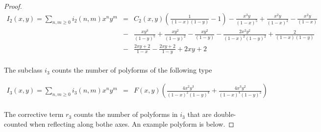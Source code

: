 \documentclass[12pt]{article}
\theoremstyle{plain}
\theoremstyle{definition}
\theoremstyle{remark}
\theoremstyle{definition}
\newcommand{\cellw}[4]{\draw[thick] ( #1 , #2 ) rectangle ( #3 , #4 );}
\newcommand{\cellb}[4]{\filldraw[black!60] ( #1 , #2 ) rectangle ( #3 , #4 ); \draw[thick] ( #1 , #2 ) rectangle ( #3 , #4 );}
\begin{document}
\begin{proof}
\begin{eqnarray*}
    I_2(x,y) = \sum_{n,m\geq 0}i_2(n,m)x^n y^m & = & C_2(x,y)\left(\frac{1}{(1-x)(1-y)} -1\right) -\frac{x^3 y}{(1-x)^5} + \frac{x^2 y}{(1-x)^2} -\frac{x^2 y}{(1-x)} \\
    & - & \frac{x y^3}{(1-y)^5} + \frac{x y^2}{(1-y)^2} -\frac{x y^2}{(1-y)} - \frac{2x^2 y^2}{(1-x)^2 (1-y)^2} + \frac{2}{(1-x)(1-y)} \\
    & - & \frac{2xy+2}{1-x} - \frac{2xy + 2}{1-y} + 2xy + 2\\
\end{eqnarray*}


The subclass $i_3$ counts the number of polyforms of the following type

\begin{center}
\end{center}

\begin{eqnarray*}
    I_3(x,y) = \sum_{n,m \geq 0}i_3(n,m)x^n y^m & = & F(x,y)\left(\frac{4x^2 y^3}{(1-x)^2 (1-y)^4} + \frac{4x^3 y^2}{(1-x)^4 (1-y)^2}\right) \\
\end{eqnarray*}


The corrective term $r_3$ counts the number of polyforms in $i_3$ that are double-counted when reflecting along bothe axes. An example polyform is below.


\end{proof}
\end{document}
